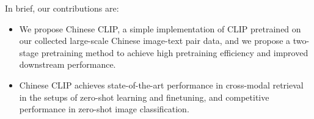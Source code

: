
In brief, our contributions are:
\begin{itemize}
    \item We propose Chinese CLIP, a simple implementation of CLIP pretrained on our collected large-scale Chinese image-text pair data, and we propose a two-stage pretraining method to achieve high pretraining efficiency and improved downstream performance.
    \item Chinese CLIP achieves state-of-the-art performance in cross-modal retrieval in the setups of zero-shot learning and finetuning, and competitive performance in zero-shot image classification. 
\end{itemize}
